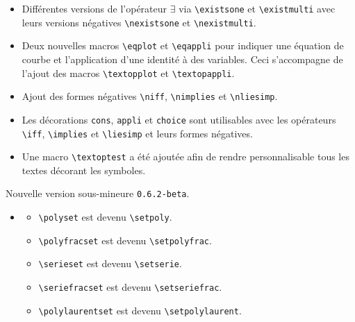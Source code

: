 \documentclass[12pt,a4paper]{book}
\makeatletter
\newcommand\env[1]{\texttt{#1}}
\newcommand\macro[1]{\env{\textbackslash{}#1}}
\theoremstyle{definition}
\newcommand\topic{\@ifstar{\@topic@star}{\@topic@no@star}}
\newcommand\@topic@no@star[1]{%
	\textbf{\textsc{#1}.}%
}
\newcommand\@topic@star[1]{%
	\textbf{\textsc{#1} :}%
}
\makeatother
\begin{document}
{{\begin{description}
\begin{itemize}[itemsep=.5em]
\begin{itemize}[itemsep=.5em]
            \item Différentes versions de l'opérateur $\exists$ via \macro{existsone} et \macro{existmulti} avec leurs versions négatives \macro{nexistsone} et \macro{nexistmulti}.
    
            \item Deux nouvelles macros \macro{eqplot} et \macro{eqappli} pour indiquer une équation de courbe et l'application d'une identité à des variables. Ceci s'accompagne de l'ajout des macros \macro{textopplot} et \macro{textopappli}.
    
            \item Ajout des formes négatives \macro{niff}, \macro{nimplies} et \macro{nliesimp}.
    
            \item Les décorations \verb+cons+, \verb+appli+ et \verb+choice+ sont utilisables avec les opérateurs \macro{iff}, \macro{implies} et \macro{liesimp} et leurs formes négatives.
    
            \item Une macro \macro{textoptest} a été ajoutée afin de rendre personnalisable tous les textes décorant les symboles.
        \end{itemize}
    \end{itemize}


    \medskip
    \item[2019-10-14] Nouvelle version sous-mineure \verb+0.6.2-beta+.
    
    \begin{itemize}[itemsep=.5em]
        \item \topic{Algèbre}
        \begin{itemize}[itemsep=.5em]
            \item \macro{polyset} est devenu \macro{setpoly}.
    
            \item \macro{polyfracset} est devenu \macro{setpolyfrac}.
    
            \item \macro{serieset} est devenu \macro{setserie}.
    
            \item \macro{seriefracset} est devenu \macro{setseriefrac}.
    
            \item \macro{polylaurentset} est devenu \macro{setpolylaurent}.
    

\end{itemize}
\end{itemize}
\end{description}}}
\end{document}
